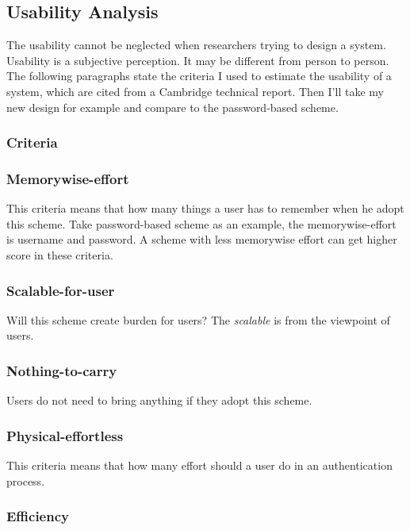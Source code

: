 \begin{CJK}{Bg5}{bsmi}
\section{Usability Analysis}

The usability cannot be neglected when researchers trying to design a system.
Usability is a subjective perception. It may be different from person to person.
The following paragraphs state the criteria I used to estimate the usability of a system, which are cited from a Cambridge technical report\cite{password-extended}. Then I'll take my new design for example and compare to the password-based scheme.

\subsubsection{Criteria}

\subsubsection{Memorywise-effort}

This criteria means that how many things a user has to remember when he adopt this scheme. Take password-based scheme as an example, the memorywise-effort is username and password. A scheme with less memorywise effort can get higher score in these criteria.

\subsubsection{Scalable-for-user}

Will this scheme create burden for users? The \emph{scalable} is from the viewpoint of users.

\subsubsection{Nothing-to-carry}

Users do not need to bring anything if they adopt this scheme.

\subsubsection{Physical-effortless}

This criteria means that how many effort should a user do in an authentication process.

\subsubsection{Efficiency}


\end{CJK}
